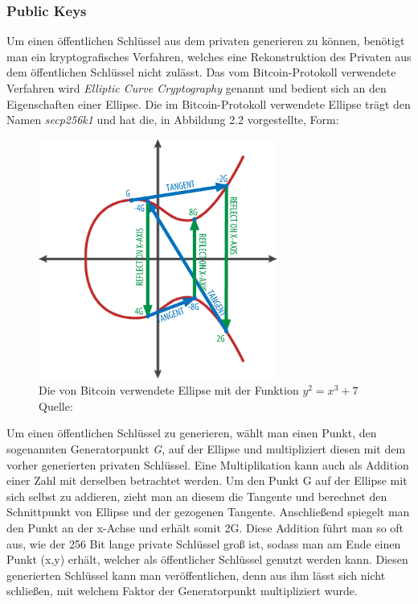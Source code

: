 \subsubsection{Public Keys}
Um einen öffentlichen Schlüssel aus dem privaten generieren zu können, benötigt man ein kryptografisches Verfahren, welches eine Rekonstruktion des Privaten aus dem öffentlichen Schlüssel nicht zulässt.
Das vom Bitcoin-Protokoll verwendete Verfahren wird \emph{Elliptic Curve Cryptography} genannt und bedient sich an den Eigenschaften einer Ellipse. Die im Bitcoin-Protokoll verwendete Ellipse trägt den Namen \emph{secp256k1} \cite[S. 60]{antanopoulos_2014} und hat die, in Abbildung 2.2 vorgestellte, Form:
\begin{figure}[htpb]
	\centering
	\includegraphics[width=0.7\textwidth]{images/elliptic_curve_cryptography.png}
	\caption{Die von Bitcoin verwendete Ellipse mit der Funktion $y^{2} = x^{3} + 7$ \\Quelle: \cite[S. 64]{antanopoulos_2014}}
	\label{6braun:fig:ellipse}
\end{figure}

Um einen öffentlichen Schlüssel zu generieren, wählt man einen Punkt, den sogenannten Generatorpunkt \emph{G}, auf der Ellipse und multipliziert diesen mit dem vorher generierten privaten Schlüssel. Eine Multiplikation kann auch als Addition einer Zahl mit derselben betrachtet werden. Um den Punkt G auf der Ellipse mit sich selbst zu addieren, zieht man an diesem die Tangente und berechnet den Schnittpunkt von Ellipse und der gezogenen Tangente. Anschließend spiegelt man den Punkt an der x-Achse und erhält somit 2G. Diese Addition führt man so oft aus, wie der 256 Bit lange private Schlüssel groß ist, sodass man am Ende einen Punkt (x,y) erhält, welcher als öffentlicher Schlüssel genutzt werden kann. Diesen generierten Schlüssel kann man veröffentlichen, denn aus ihm lässt sich nicht schließen, mit welchem Faktor der Generatorpunkt multipliziert wurde.

